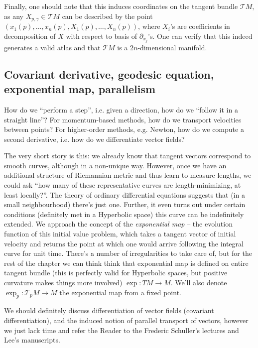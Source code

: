 Finally, one should note that this induces coordinates on the tangent bundle \(
\mathcal{T}M \), as any \( X_{p,\gamma} \in \mathcal{T}M \) can be described
by the point \( (x_1(p), \ldots, x_n(p), X_1(p), \ldots, X_n(p)) \),
where \( X_i \)'s are coefficients in decomposition of \( X \) with respect
to basis of \( \partial_{x_j} \)'s. One can verify that this indeed generates
a valid atlas and that \( \mathcal{T}M \) is a \(2n\)-dimensional manifold.

\subsection*{Covariant derivative, geodesic equation, exponential map, parallelism}

How do we ``perform a step'', i.e. given a direction, how do we ``follow it in
a straight line''? For momentum-based methods, how do we transport velocities
between points? For higher-order methods, e.g. Newton, how do we compute a
second derivative, i.e. how do we differentiate vector fields?

The very short story is this: we already know that tangent vectors correspond
to smooth curves, although in a non-unique way. However, once we have an
additional structure of Riemannian metric and thus learn to measure lengths, we
could ask ``how many of these representative curves are length-minimizing, at
least locally?''. The theory of ordinary differential equations suggests that
(in a small neighbourhood) there's just one. Further, it even turns out under
certain conditions (definitely met in a Hyperbolic space) this curve can be
indefinitely extended. We approach the concept of the \emph{exponential map} --
the evolution function of this initial value problem, which takes a tangent
vector of initial velocity and returns the point at which one would arrive
following the integral curve for unit time. There's a number of irregularities
to take care of, but for the rest of the chapter we can think think
that exponential map is defined on entire tangent bundle (this is perfectly
valid for Hyperbolic spaces, but positive curvature makes things more involved)
\( \exp: TM \to M \). We'll also denote \( \exp_p: \mathcal{T}_pM \to M \)
the exponential map from a fixed point.

We should definitely discuss differentiation of vector fields (covariant
differentiation), and the induced notion of parallel transport of vectors,
however we just lack time and refer the Reader to the Frederic Schuller's
lectures and Lee's manuscripts.

